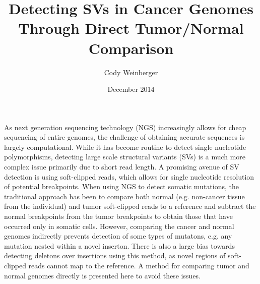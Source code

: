 \documentclass{easychithesis}
\begin{document}
\title{Detecting SVs in Cancer Genomes Through Direct Tumor/Normal Comparison} 
\author{Cody Weinberger}
\date{December 2014}
\maketitle




As next generation sequencing technology (NGS) increasingly allows for cheap sequencing of entire genomes, the challenge of obtaining accurate sequences is largely computational. While it has become routine to detect single nucleotide polymorphisms, detecting large scale structural variants (SVs) is a much more complex issue primarily due to short read length. A promising avenue of SV detection is using soft-clipped reads, which allows for single nucleotide resolution of potential breakpoints. When using NGS to detect somatic mutations, the traditional approach has been to compare both normal (e.g. non-cancer tissue from the individual) and tumor soft-clipped reads to a reference and subtract the normal breakpoints from the tumor breakpoints to obtain those that have occurred only in somatic cells. However, comparing the cancer and normal genomes indirectly prevents detection of some types of mutatons, e.g. any mutation nested within a novel inserton. There is also a large bias towards detecting deletons over insertions using this method, as novel regions of soft-clipped reads cannot map to the reference. A method for comparing tumor and normal genomes directly is presented here to avoid these issues.
\end{document}
